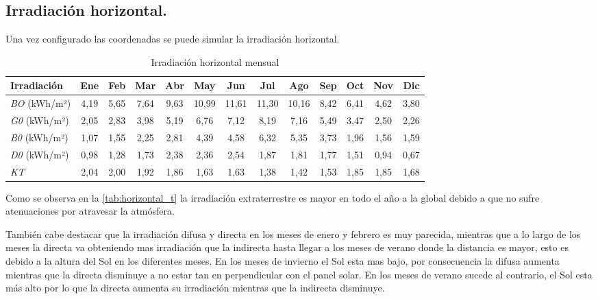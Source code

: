 \documentclass[12pt]{article}
\begin{document}
\subsection{Irradiación horizontal. }
Una vez configurado las coordenadas se puede simular la irradiación horizontal.
\begin{table}[h]
	\centering

	\caption{Irradiación horizontal mensual}
	\label{tab:horizontal_t}
	\small  %
	\begin{tabular}{lcccccccccccc}
		\toprule
		\textbf{Irradiación} & \textbf{Ene} & \textbf{Feb} & \textbf{Mar} & \textbf{Abr} & \textbf{May} & \textbf{Jun} & \textbf{Jul} & \textbf{Ago} & \textbf{Sep} & \textbf{Oct} & \textbf{Nov} & \textbf{Dic} \\
		\midrule
		\textit{BO} (kWh/m²)  & 4,19 & 5,65 & 7,64 & 9,63 & 10,99 & 11,61 & 11,30 & 10,16 & 8,42 & 6,41 & 4,62 & 3,80 \\
		\textit{G0} (kWh/m²)& 2,05 & 2,83 & 3,98 & 5,19 & 6,76 & 7,12 & 8,19 & 7,16 & 5,49 & 3,47 & 2,50 & 2,26 \\
		\textit{B0} (kWh/m²)  & 1,07 & 1,55 & 2,25 & 2,81 & 4,39 & 4,58 & 6,32 & 5,35 & 3,73 & 1,96 & 1,56 & 1,59 \\
		\textit{D0} (kWh/m²) & 0,98 & 1,28 & 1,73 & 2,38 & 2,36 & 2,54 & 1,87 & 1,81 & 1,77 & 1,51 & 0,94 & 0,67 \\
		\textit{KT} & 2,04 & 2,00 & 1,92 & 1,86 & 1,63 & 1,63 & 1,38 & 1,42 & 1,53 & 1,85 & 1,85 & 1,68 \\
		\bottomrule
	\end{tabular}

\end{table}

Como se observa en la \autoref{tab:horizontal_t} la irradiación extraterrestre es mayor en todo el año a la global debido a que no sufre atenuaciones por atravesar la atmósfera.

También cabe destacar que la irradiación difusa y directa en los meses de enero y febrero es muy parecida, mientras que a lo largo de los meses la directa va obteniendo mas irradiación que la indirecta hasta llegar a los meses de verano donde la distancia es mayor, esto es debido a la altura del Sol en los diferentes meses. En los meses de invierno el Sol esta mas bajo, por consecuencia la difusa aumenta mientras que la directa disminuye a no estar tan en perpendicular con el panel solar. En los meses de verano sucede al contrario, el Sol esta más alto por lo que la directa aumenta su irradiación mientras que la indirecta disminuye.
\end{document}
